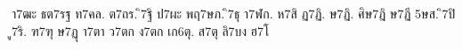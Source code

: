 {า7ฒะ
ธต7รฐ
ท7คล.
ต7ถร.
ิ7ฐิ
ป7ผะ
พฤ7ษภ.
ิ7ธุ
า7ฬก.
ห7สิ
ฏ7ฏิ.
ษ7ฏิ.
ศิษ7ฎิ
ษ7ฏี
5ษส.
ิ7ปิ
ู7ริ.
ฑ7ฑุ
ษ7ฏุ
า7ตา
ว7ตก
ง7ตก
เก6ตุ.
ส7ตุ
ลิ7บง
ฮ7โ
}
